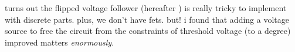 turns out the flipped voltage follower (hereafter \fvf) is really tricky to
implement with discrete parts. plus, we don't have fets. but! i found that
adding a voltage source to free the circuit from the constraints of threshold
voltage (to a degree) improved matters \emph{enormously}.

